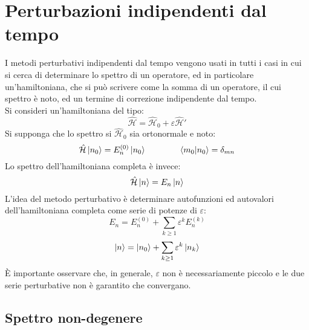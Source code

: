 
\section{Perturbazioni indipendenti dal tempo}

I metodi perturbativi indipendenti dal tempo vengono usati in tutti i casi in cui si cerca di determinare lo spettro di un operatore, ed in particolare un'hamiltoniana, che si può scrivere come la somma di un operatore, il cui spettro è noto, ed un termine di correzione indipendente dal tempo.\\
Si consideri un'hamiltoniana del tipo:
\begin{equation}
	\hat{\mathcal{H}} = \hat{\mathcal{H}}_0 + \varepsilon \hat{\mathcal{H}}'
	\label{eq:5.1}
\end{equation}
Si supponga che lo spettro si $ \hat{\mathcal{H}}_0 $ sia ortonormale e noto:
\begin{equation}
	\hat{\mathcal{H}} \ket{n_0} = E_n^{(0)} \ket{n_0}
	\qquad \qquad
	\braket{m_0 | n_0} = \delta_{mn}
	\label{eq:5.2}
\end{equation}
Lo spettro dell'hamiltoniana completa è invece:
\begin{equation}
	\hat{\mathcal{H}} \ket{n} = E_n \ket{n}
	\label{eq:5.3}
\end{equation}
L'idea del metodo perturbativo è determinare autofunzioni ed autovalori dell'hamiltoniana completa come serie di potenze di $ \varepsilon $:
\begin{equation}
	E_n = E_n^{(0)} + \sum_{k \ge 1} \varepsilon^k E_n^{(k)}
	\label{eq:5.4}
\end{equation}
\begin{equation}
	\ket{n} = \ket{n_0} + \sum_{k \ge 1} \varepsilon^k \ket{n_k}
	\label{eq:5.5}
\end{equation}
È importante osservare che, in generale, $ \varepsilon $ non è necessariamente piccolo e le due serie perturbative non è garantito che convergano.

\subsection{Spettro non-degenere}

